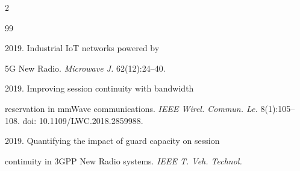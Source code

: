 \vspace*{6pt}





  \begin{multicols}{2}





\renewcommand{\bibname}{\protect\rmfamily References}













{\small\frenchspacing


 {%




 \begin{thebibliography}{99} 






 2019. Industrial IoT networks powered by 


5G New Radio. \textit{Microwave J.} 62(12):24--40.









 2019. Improving session continuity with bandwidth 


reservation in mmWave communications. \textit{IEEE Wirel. Commun. Le.} 8(1):105--108. doi: 10.1109/LWC.2018.2859988.









 2019. Quantifying the impact of guard capacity on session 


continuity in 3GPP New Radio systems. \textit{IEEE T. Veh. Technol.} 



\end{thebibliography}}}
\end{multicols}
